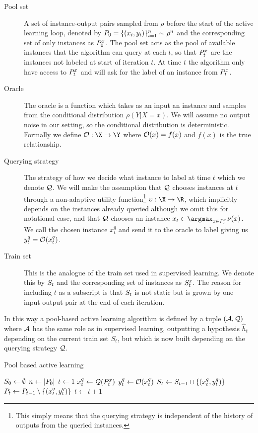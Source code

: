 \begin{description}
\item[{Pool set}] A set of instance-output pairs sampled from \(\rho\) before
the start of the active learning loop, denoted by \(P_{0} = \{(x_{i},
y_{i})\}_{i=1}^{n} \sim \rho^{n}\) and the corresponding set of only instances as
\(P^x_{0}\). The pool set acts as the pool of available instances that
the algorithm can query at each \(t\), so that \(P^x_{t}\) are the
instances not labeled at start of iteration \(t\). At time \(t\) the algorithm
only have access to \(P^x_{t}\) and will ask for the label of an instance
from \(P^x_{t}\).
\item[{Oracle}] The oracle is a function which takes as an input an instance and
samples from the conditional distribution \(\rho(Y | X = x)\). We will assume no
output noise in our setting, so the conditional distribution is
deterministic. Formally we define \(\oracle: \X \to \Y\) where \(\mathcal{O}(x) =
f(x)\) and \(f(x)\) is the true relationship.
\item[{Querying strategy}] The strategy of how we decide what instance to label
at time \(t\) which we denote \(\mathcal{Q}\). We will make the assumption that
\(\mathcal{Q}\) chooses instances at \(t\) through a non-adaptive utility
function\footnote{This simply means that the querying strategy is independent of
the history of outputs from the queried instances.} \(\upsilon: \X \to \R\),
which implicitly depends on the instances already queried although we omit this
for notational ease, and that \(\mathcal{Q}\) chooses an instance \(x_{t} \in
\argmax_{x \in \poolsetx_{t}} \nu(x)\). We call the chosen instance \(x^{q}_{t}\) and send it
to the oracle to label giving us \(y^{q}_{t} = \mathcal{O}(x^{q}_{t})\).
\item[{Train set}] This is the analogue of the train set used in supervised
learning. We denote this by \(S_{t}\) and the corresponding set of
instances as \(S^x_{t}\). The reason for including \(t\) as a subscript
is that \(S_{t}\) is not static but is grown by one input-output pair at
the end of each iteration.
\end{description}

In this way a pool-based active learning algorithm is defined by a tuple
\((\mathcal{A}, \mathcal{Q})\) where \(\mathcal{A}\) has the same role as in supervised
learning, outputting a hypothesis \(\hat{h}_{t}\) depending on the current train
set \(S_{t}\), but which is now built depending on the querying strategy
\(\mathcal{Q}\).
\begin{algorithm}
  \caption{Pool based active learning}\label{alg:active-learning}
  \begin{algorithmic}[1]  \State $S_0 \gets \emptyset$ \State $n \gets
|P_{0}|$ \State $t \gets 1$  \State $x^q_t \gets
\mathcal{Q}(P^x_{t})$ \State $y^q_t \gets \mathcal{O}(x^q_t)$ \State
$S_{t} \gets S_{t-1} \cup \{(x^q_t, y^q_t)\}$ \State $P_t
\gets P_{t-1} \setminus \{(x^q_t, y^q_t)\}$ \State $t \gets t + 1$ \EndWhile
\EndProcedure
  \end{algorithmic}
\end{algorithm}

